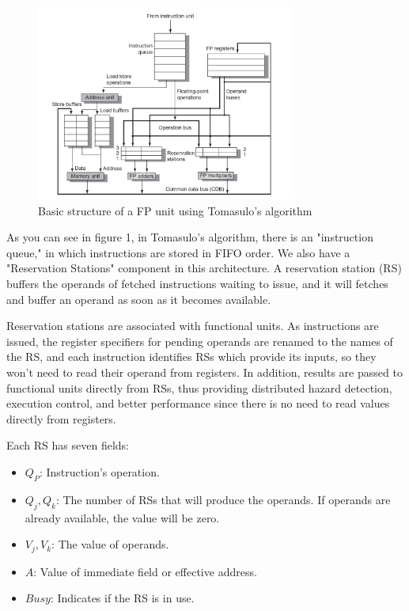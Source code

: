 \documentclass[12pt]{article}
\begin{document}
\begin{figure}[H]
	\centering
	\includegraphics[width=0.75\textwidth]{./images/tomas/tomas.png}	
	\cprotect\caption{Basic structure of a FP unit using Tomasulo’s algorithm}
\end{figure}


As you can see in figure 1, in Tomasulo's algorithm, there is an "instruction queue," in which instructions are stored in FIFO order. We also have a "Reservation Stations" component in this architecture. A reservation station (RS) buffers the operands of fetched instructions waiting to issue, and it will fetches and buffer an operand as soon as it becomes available.

Reservation stations are associated with functional units. As instructions are issued, the register specifiers for pending operands are renamed to the names of the RS, and each instruction identifies RSs which provide its inputs, so they won't need to read their operand from registers.
In addition, results are passed to functional units directly from RSs, thus providing distributed hazard detection, execution control, and better performance since there is no need to read values directly from registers.

Each RS has seven fields:

\begin{itemize}
	\item $Q_P$: Instruction's operation.
	\item $Q_j, Q_k$: The number of RSs that will produce the operands. If operands are already available, the value will be zero.
	\item $V_j, V_k$: The value of operands.
	\item $A$: Value of immediate field or effective address.
	\item $Busy$: Indicates if the RS is in use.
\end{itemize}
\end{document}
